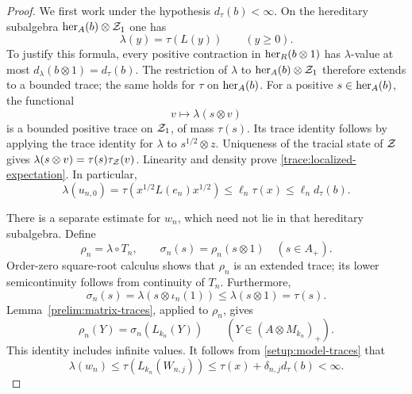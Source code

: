 \begin{proof}
We first work under the hypothesis $d_\tau(b)<\infty$.
On the hereditary subalgebra
$\operatorname{her}_A(b)\otimes\mathcal Z_1$ one has
\begin{equation}\label{trace:localized-expectation}
 \lambda(y)=\tau(L(y))\qquad(y\geq0).
\end{equation}
To justify this formula, every positive contraction in
$\operatorname{her}_R(b\otimes1)$ has $\lambda$-value at most
$d_\lambda(b\otimes1)=d_\tau(b)$.  The restriction of $\lambda$
to $\operatorname{her}_A(b)\otimes\mathcal Z_1$ therefore extends to a bounded trace;
the same holds for $\tau$ on $\operatorname{her}_A(b)$.  For a positive
$s\in\operatorname{her}_A(b)$, the functional
\[
 v\longmapsto\lambda(s\otimes v)
\]
is a bounded positive trace on $\mathcal Z_1$, of mass $\tau(s)$.
Its trace identity follows by applying the trace identity for
$\lambda$ to $s^{1/2}\otimes z$.  Uniqueness of the tracial state
of $\mathcal Z$ gives $\lambda(s\otimes v)=\tau(s)\tau_{\mathcal Z}(v)$.
Linearity and density prove \eqref{trace:localized-expectation}.
In particular,
\begin{equation}\label{trace:first-small-part}
 \lambda(u_{n,0})
 =\tau(x^{1/2}L(e_n)x^{1/2})
 \leq\ell_n\tau(x)
 \leq\ell_n d_\tau(b).
\end{equation}

There is a separate estimate for $w_n$, which need not lie in that
hereditary subalgebra.  Define
\[
 \rho_n=\lambda\circ T_n,
 \qquad
 \sigma_n(s)=\rho_n(s\otimes1)\quad(s\in A_+).
\]
Order-zero square-root calculus shows that $\rho_n$ is an extended
trace; its lower semicontinuity follows from continuity of $T_n$.
Furthermore,
\[
 \sigma_n(s)
 =\lambda(s\otimes\iota_n(1))\leq\lambda(s\otimes1)=\tau(s).
\]
Lemma~\ref{prelim:matrix-traces}, applied to $\rho_n$, gives
\begin{equation}\label{trace:matrix-formula}
 \rho_n(Y)=\sigma_n(L_{k_n}(Y))
 \qquad(Y\in(A\otimes M_{k_n})_+).
\end{equation}
This identity includes infinite values. It follows from
\eqref{setup:model-traces} that
\begin{equation}\label{trace:retained-finite}
 \lambda(w_n)
 \leq\tau(L_{k_n}(W_{n,j}))
 \leq\tau(x)+\delta_{n,j}d_\tau(b)<\infty.
\end{equation}


\end{proof}
